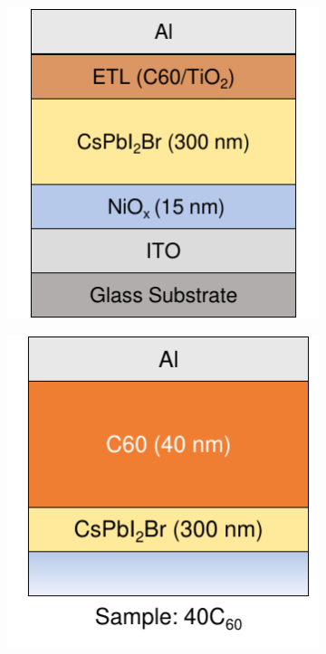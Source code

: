 \begin{figure}[htbp]
    \centering
    \begin{subfigure}{0.24\textwidth}
        \centering
        \includegraphics[width=\textwidth]{chapters/transport_layers/images/ETL_optimization_stack.pdf}
        \caption{}
        \label{}
    \end{subfigure}
    \hfill
    \begin{subfigure}{0.24\textwidth}
        \centering
        \includegraphics[width=\textwidth]{chapters/transport_layers/images/ETL_Optimization_40C60.pdf}

\end{subfigure}
\end{figure}
